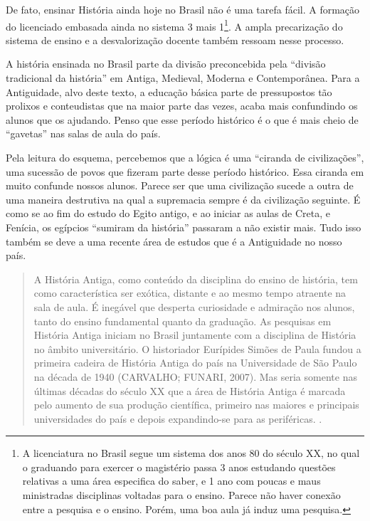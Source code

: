 \begin{refsection}
    De fato, ensinar História ainda hoje no Brasil não é uma tarefa fácil. A formação do licenciado embasada ainda no sistema 3 mais 1\footnote{A licenciatura no Brasil segue um sistema dos anos 80 do século XX, no qual o graduando para exercer o magistério passa 3 anos estudando questões relativas a uma área especifica do saber, e 1 ano com poucas e maus ministradas disciplinas voltadas para o ensino. Parece não haver conexão entre a pesquisa e o ensino. Porém, uma boa aula já induz uma pesquisa.}. A ampla precarização do sistema de ensino e a desvalorização docente também ressoam nesse processo.

    A história ensinada no Brasil parte da divisão preconcebida pela ``divisão tradicional da história'' em Antiga, Medieval, Moderna e Contemporânea. Para a Antiguidade, alvo deste texto, a educação básica parte de pressupostos tão prolixos e conteudistas que na maior parte das vezes, acaba mais confundindo os alunos que os ajudando. Penso que esse período histórico é o que é mais cheio de ``gavetas'' nas salas de aula do país.  

    Pela leitura do esquema, percebemos que a lógica é uma ``ciranda de civilizações'', uma sucessão de povos que fizeram parte desse período histórico. Essa ciranda em muito confunde nossos alunos. Parece ser que uma civilização sucede a outra de uma maneira destrutiva na qual a supremacia sempre é da civilização seguinte. É como se ao fim do estudo do Egito antigo, e ao iniciar as aulas de Creta, e Fenícia, os egípcios ``sumiram da história'' passaram a não existir mais. Tudo isso também se deve a uma recente área de estudos que é a Antiguidade no nosso país.

    \begin{quotation}
        A História Antiga, como conteúdo da disciplina do ensino de história, tem como característica ser exótica, distante e ao mesmo tempo atraente na sala de aula. É inegável que desperta curiosidade e admiração nos alunos, tanto do ensino fundamental quanto da graduação. As pesquisas em História Antiga iniciam no Brasil juntamente com a disciplina de História no âmbito universitário. O historiador Eurípides Simões de Paula fundou a primeira cadeira de História Antiga do país na Universidade de São Paulo na década de 1940 (CARVALHO; FUNARI, 2007). Mas seria somente nas últimas décadas do século XX que a área de História Antiga é marcada pelo aumento de sua produção científica, primeiro nas maiores e principais universidades do país e depois expandindo-se para as periféricas. \cite[p.~4]{SilvaAndGoncalves2015Ensino}. 
    \end{quotation}


\end{refsection}
